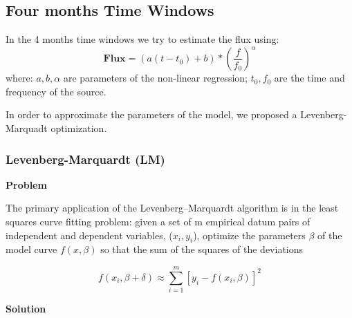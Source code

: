 \documentclass[10pt]{article}
\begin{document}

\subsection{Four months Time Windows}
In the 4 months time windows we try to estimate the flux using:
$$ \mathbf{Flux} = (a(t-t_0)+b)*\left(\frac{f}{f_0}\right)^\alpha $$
where: $a,b,\alpha$ are parameters of the non-linear regression; $t_0, f_0$ are
the time and frequency of the source.

In order to approximate the parameters of the model, we proposed a
Levenberg-Marquadt optimization. 

\subsubsection{Levenberg-Marquardt (LM)}
\textbf{Problem} 

The primary application of the Levenberg–Marquardt algorithm is in the least
squares curve fitting problem: given a set of m empirical datum pairs of
independent and dependent variables, ($x_i, y_i$), optimize the parameters
$\beta$ of the model curve $f(x,\beta)$ so that the sum of the squares of the
deviations

$$ f(x_i, \beta + \delta) \approx \sum\limits_{i=1}^m [y_i - f(x_i, \beta)]^2 $$

\noindent\textbf{Solution} 
\end{document}
